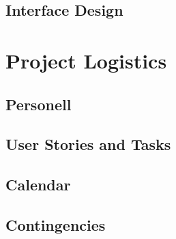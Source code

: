 \documentclass[12pt]{article}
\begin{document}
\subsection{Interface Design}


\section{Project Logistics}

\subsection{Personell}

\subsection{User Stories and Tasks}

\subsection{Calendar}

\subsection{Contingencies}
\end{document}
